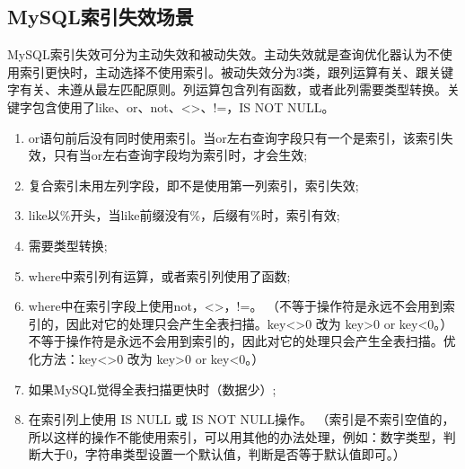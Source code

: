 \documentclass[../../../interview-questions.tex]{subfiles}
\begin{document}
\subsection{MySQL索引失效场景}

MySQL索引失效可分为主动失效和被动失效。主动失效就是查询优化器认为不使用索引更快时，主动选择不使用索引。被动失效分为3类，跟列运算有关、跟关键字有关、未遵从最左匹配原则。列运算包含列有函数，或者此列需要类型转换。关键字包含使用了like、or、not、<>、!=，IS NOT NULL。

\begin{enumerate}
\item {or语句前后没有同时使用索引。当or左右查询字段只有一个是索引，该索引失效，只有当or左右查询字段均为索引时，才会生效;}
\item {复合索引未用左列字段，即不是使用第一列索引，索引失效;}
\item {like以\%开头，当like前缀没有\%，后缀有\%时，索引有效;}
\item {需要类型转换;}
\item {where中索引列有运算，或者索引列使用了函数;}
\item {where中在索引字段上使用not，<>，!=。}
  （不等于操作符是永远不会用到索引的，因此对它的处理只会产生全表扫描。key<>0 改为 key>0 or key<0。）不等于操作符是永远不会用到索引的，因此对它的处理只会产生全表扫描。优化方法：key<>0 改为 key>0 or key<0。）
\item {如果MySQL觉得全表扫描更快时（数据少）;}
\item {在索引列上使用 IS NULL 或 IS NOT NULL操作。}
（索引是不索引空值的，所以这样的操作不能使用索引，可以用其他的办法处理，例如：数字类型，判断大于0，字符串类型设置一个默认值，判断是否等于默认值即可。）
\end{enumerate}
\end{document}

